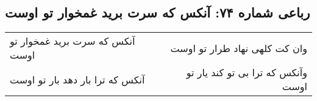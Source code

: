\begin{center}
\section*{رباعی شماره ۷۴: آنکس که سرت برید غمخوار تو اوست}
\label{sec:sh074}
\begin{longtable}{l p{0.5cm} r}
آنکس که سرت برید غمخوار تو اوست
&&
وان کت کلهی نهاد طرار تو اوست
\\
آنکس که ترا بار دهد بار تو اوست
&&
وآنکس که ترا بی تو کند یار تو اوست
\\
\end{longtable}
\end{center}
